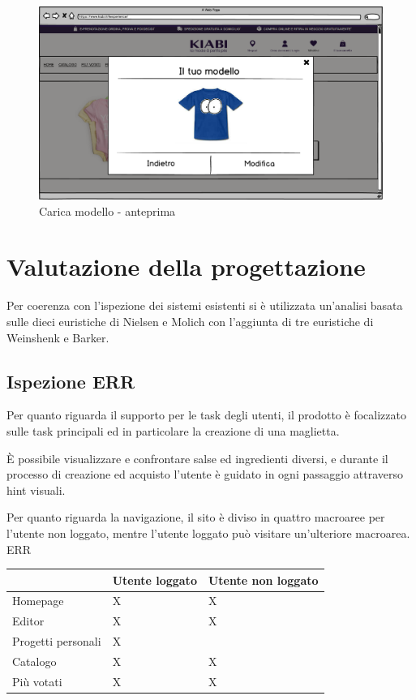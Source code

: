 \documentclass[12pt,italian,]{report}
\begin{document}
\begin{figure}[h]
\centering
\includegraphics{img/balsamiq/UploadedModel.png}
\caption{Carica modello - anteprima}
\end{figure}

\hypertarget{valutazione-della-progettazione}{%
\chapter{Valutazione della
progettazione}\label{valutazione-della-progettazione}}

Per coerenza con l'ispezione dei sistemi esistenti si è utilizzata
un'analisi basata sulle dieci euristiche di Nielsen e Molich con
l'aggiunta di tre euristiche di Weinshenk e Barker.

\hypertarget{ispezione-err}{%
\section{Ispezione ERR}\label{ispezione-err}}

Per quanto riguarda il supporto per le task degli utenti, il prodotto è
focalizzato sulle task principali ed in particolare la creazione di una
maglietta.

È possibile visualizzare e confrontare salse ed ingredienti diversi, e
durante il processo di creazione ed acquisto l'utente è guidato in ogni
passaggio attraverso hint visuali.

Per quanto riguarda la navigazione, il sito è diviso in quattro
macroaree per l'utente non loggato, mentre l'utente loggato può visitare
un'ulteriore macroarea. ERR

\begin{longtable}[]{@{}lll@{}}
\toprule
& Utente loggato & Utente non loggato\tabularnewline
\midrule
\endhead
Homepage & X & X\tabularnewline
Editor & X & X\tabularnewline
Progetti personali & X &\tabularnewline
Catalogo & X & X\tabularnewline
Più votati & X & X\tabularnewline
\bottomrule
\end{longtable}
\end{document}
